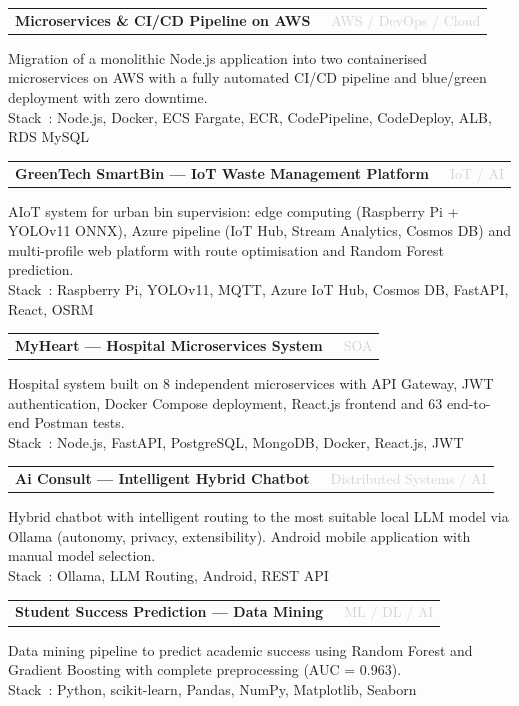 \documentclass[10pt,a4paper]{article}
\makeatletter
\newcommand{\projentry}[2]{%
  \noindent\begin{tabularx}{\linewidth}{@{}X r@{}}
    \textbf{#1} & {\small\textcolor{lightgray}{\faTag\ #2}}
  \end{tabularx}\vspace{0pt}}
\makeatother
\begin{document}
\begin{minipage}[t]{0.585\linewidth}
\projentry{Microservices \& CI/CD Pipeline on AWS}{AWS / DevOps / Cloud}
\noindent\small
Migration of a monolithic Node.js application into two containerised microservices
on AWS with a fully automated CI/CD pipeline and blue/green deployment
with zero downtime.\\
Stack~: Node.js, Docker, ECS Fargate, ECR, CodePipeline, CodeDeploy, ALB, RDS MySQL

\vspace{4pt}

\projentry{GreenTech SmartBin --- IoT Waste Management Platform}{IoT / AI}
\noindent\small
AIoT system for urban bin supervision: edge computing (Raspberry Pi +
YOLOv11 ONNX), Azure pipeline (IoT Hub, Stream Analytics, Cosmos DB)
and multi-profile web platform with route optimisation and Random Forest prediction.\\
Stack~: Raspberry Pi, YOLOv11, MQTT, Azure IoT Hub, Cosmos DB, FastAPI, React, OSRM

\vspace{4pt}

\projentry{MyHeart --- Hospital Microservices System}{SOA}
\noindent\small
Hospital system built on 8 independent microservices with API Gateway,
JWT authentication, Docker Compose deployment, React.js frontend
and 63 end-to-end Postman tests.\\
Stack~: Node.js, FastAPI, PostgreSQL, MongoDB, Docker, React.js, JWT

\vspace{4pt}

\projentry{Ai Consult --- Intelligent Hybrid Chatbot}{Distributed Systems / AI}
\noindent\small
Hybrid chatbot with intelligent routing to the most suitable local LLM model
via Ollama (autonomy, privacy, extensibility). Android mobile application
with manual model selection.\\
Stack~: Ollama, LLM Routing, Android, REST API

\vspace{4pt}

\projentry{Student Success Prediction --- Data Mining}{ML / DL / AI}
\noindent\small
Data mining pipeline to predict academic success using Random Forest
and Gradient Boosting with complete preprocessing (AUC = 0.963).\\
Stack~: Python, scikit-learn, Pandas, NumPy, Matplotlib, Seaborn

\end{minipage}%
\hfill%
\end{document}
